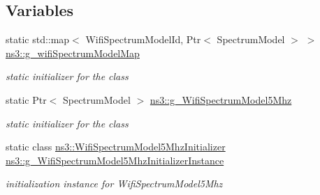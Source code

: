 \subsection*{Variables}
\begin{DoxyCompactItemize}
\item 
static std\+::map$<$ Wifi\+Spectrum\+Model\+Id, Ptr$<$ Spectrum\+Model $>$ $>$ \hyperlink{namespacens3_a973157d1ac2cfc5e6b3d60be8a7d721d}{ns3\+::g\+\_\+wifi\+Spectrum\+Model\+Map}
\begin{DoxyCompactList}\small\item\em static initializer for the class \end{DoxyCompactList}\item 
static Ptr$<$ Spectrum\+Model $>$ \hyperlink{namespacens3_a333f39e20bd1e6b083d03c143b0be161}{ns3\+::g\+\_\+\+Wifi\+Spectrum\+Model5\+Mhz}
\begin{DoxyCompactList}\small\item\em static initializer for the class \end{DoxyCompactList}\item 
static class \hyperlink{classns3_1_1WifiSpectrumModel5MhzInitializer}{ns3\+::\+Wifi\+Spectrum\+Model5\+Mhz\+Initializer} \hyperlink{namespacens3_a1f3fd42be2d5d77f19e5f0b7c05205c5}{ns3\+::g\+\_\+\+Wifi\+Spectrum\+Model5\+Mhz\+Initializer\+Instance}
\begin{DoxyCompactList}\small\item\em initialization instance for Wifi\+Spectrum\+Model5\+Mhz \end{DoxyCompactList}\end{DoxyCompactItemize}

